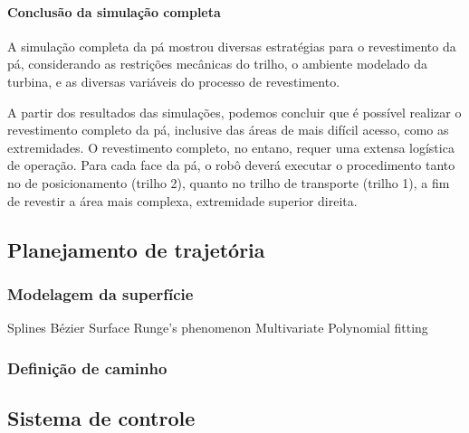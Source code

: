 \paragraph{Conclusão da simulação completa}

A simulação completa da pá mostrou diversas estratégias para o revestimento da
pá, considerando as restrições mecânicas do trilho, o ambiente modelado da
turbina, e as diversas variáveis do processo de revestimento.

A partir dos resultados das simulações, podemos concluir que é possível realizar
o revestimento completo da pá, inclusive das áreas de mais difícil acesso, como
as extremidades. O revestimento completo, no entano, requer uma extensa
logística de operação. Para cada face da pá, o robô deverá executar o
procedimento tanto no de posicionamento (trilho 2), quanto no trilho de
transporte (trilho 1), a fim de revestir a área mais complexa, extremidade
superior direita. 

\subsection{Planejamento de trajetória}

\subsubsection{Modelagem da superfície}

Splines
Bézier Surface
Runge's phenomenon
Multivariate Polynomial fitting


\subsubsection{Definição de caminho}


\subsection{Sistema de controle}
